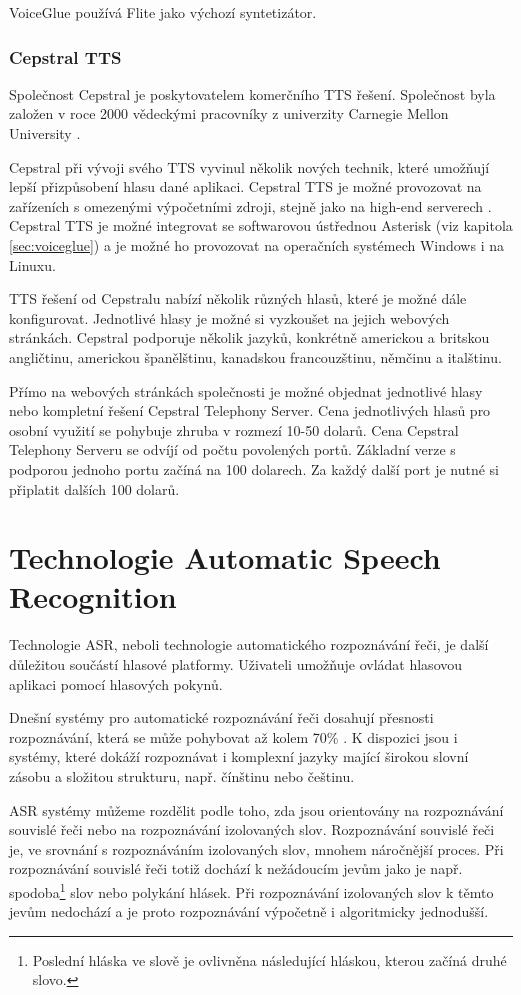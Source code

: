 \documentclass[ing,male,java,dept460]{diploma}						%
\begin{document}
VoiceGlue používá Flite jako výchozí syntetizátor.

\subsubsection{Cepstral TTS}
\label{sec:cepstral}
Společnost Cepstral je poskytovatelem komerčního TTS řešení. Společnost byla založen v roce 2000 vědeckými pracovníky z univerzity Carnegie Mellon University \cite{cepstral_wiki}.

Cepstral při vývoji svého TTS vyvinul několik nových technik, které umožňují lepší přizpůsobení hlasu dané aplikaci. Cepstral TTS je možné provozovat na zařízeních s omezenými výpočetními zdroji, stejně jako na high-end serverech \cite{cepstral_com}. Cepstral TTS je možné integrovat se softwarovou ústřednou Asterisk (viz kapitola \ref{sec:voiceglue}) a je možné ho provozovat na operačních systémech Windows i na Linuxu.

TTS řešení od Cepstralu nabízí několik různých hlasů, které je možné dále konfigurovat. Jednotlivé hlasy je možné si vyzkoušet na jejich webových stránkách. Cepstral podporuje několik jazyků, konkrétně americkou a britskou angličtinu, americkou španělštinu, kanadskou francouzštinu, němčinu a italštinu.

Přímo na webových stránkách společnosti je možné objednat jednotlivé hlasy nebo kompletní řešení Cepstral Telephony Server. Cena jednotlivých hlasů pro osobní využití se pohybuje zhruba v rozmezí 10-50 dolarů. Cena Cepstral Telephony Serveru se odvíjí od počtu povolených portů. Základní verze s podporou jednoho portu začíná na 100 dolarech. Za každý další port je nutné si připlatit dalších 100 dolarů.

\section{Technologie Automatic Speech Recognition}
\label{sec:ASR}
Technologie ASR, neboli technologie automatického rozpoznávání řeči, je další důležitou součástí hlasové platformy. Uživateli umožňuje ovládat hlasovou aplikaci pomocí hlasových pokynů.

Dnešní systémy pro automatické rozpoznávání řeči dosahují přesnosti rozpoznávání, která se může pohybovat až kolem 70\% \cite{vxmldevguide}. K dispozici jsou i systémy, které dokáží rozpoznávat i komplexní jazyky mající širokou slovní zásobu a složitou strukturu, např. čínštinu nebo češtinu.

ASR systémy můžeme rozdělit podle toho, zda jsou orientovány na rozpoznávání souvislé řeči nebo na rozpoznávání izolovaných slov. Rozpoznávání souvislé řeči je, ve srovnání s rozpoznáváním izolovaných slov, mnohem náročnější proces. Při rozpoznávání souvislé řeči totiž dochází k nežádoucím jevům jako je např. spodoba\footnote{Poslední hláska ve slově je ovlivněna následující hláskou, kterou začíná druhé slovo.} slov nebo polykání hlásek. Při rozpoznávání izolovaných slov k těmto jevům nedochází a je proto rozpoznávání výpočetně i algoritmicky jednodušší.
\end{document}
